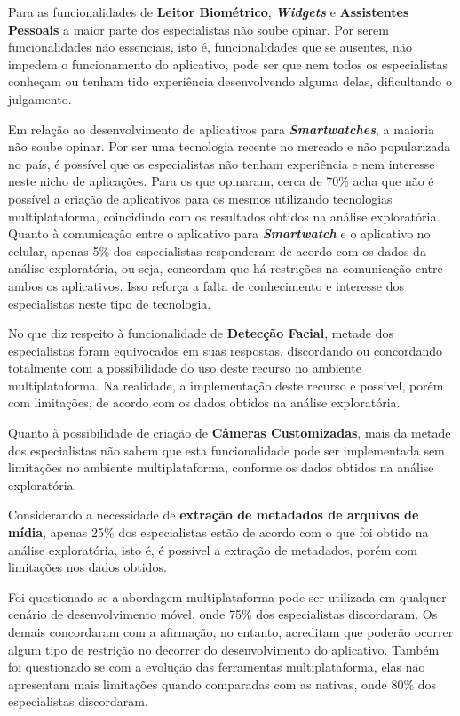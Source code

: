 Para as funcionalidades de \textbf{Leitor Biométrico}, \textbf{\textit{Widgets}} e \textbf{Assistentes Pessoais} a maior parte dos especialistas não soube opinar. Por serem funcionalidades não essenciais, isto é, 
funcionalidades que se ausentes, não impedem o funcionamento do aplicativo, pode ser que nem todos os especialistas conheçam ou tenham tido experiência desenvolvendo alguma delas, dificultando o julgamento. 

Em relação ao desenvolvimento de aplicativos para \textbf{\textit{Smartwatches}}, a maioria não soube opinar. Por ser uma tecnologia recente no mercado e não popularizada no país, é possível que os especialistas não 
tenham experiência e nem interesse neste nicho de aplicações. Para os que opinaram, cerca de 70\% acha que não é possível a criação de aplicativos para os mesmos utilizando tecnologias multiplataforma, coincidindo com 
os resultados obtidos na análise exploratória. Quanto à comunicação entre o aplicativo para \textbf{\textit{Smartwatch}} e o aplicativo no celular, apenas 5\% dos especialistas responderam de acordo com os dados da análise 
exploratória, ou seja, concordam que há restrições na comunicação entre ambos os aplicativos. Isso reforça a falta de conhecimento e interesse dos especialistas neste tipo de tecnologia.

No que diz respeito à funcionalidade de \textbf{Detecção Facial}, metade dos especialistas foram equivocados em suas respostas, discordando ou concordando totalmente com a possibilidade do uso deste recurso no ambiente 
multiplataforma. Na realidade, a implementação deste recurso e possível, porém com limitações, de acordo com os dados obtidos na análise exploratória.  

Quanto à possibilidade de criação de \textbf{Câmeras Customizadas}, mais da metade dos especialistas não sabem que esta funcionalidade pode ser implementada sem limitações no ambiente multiplataforma, conforme os dados 
obtidos na análise exploratória.

Considerando a necessidade de \textbf{extração de metadados de arquivos de mídia}, apenas 25\% dos especialistas estão de acordo com o que foi obtido na análise exploratória, isto é, é possível a extração de metadados, porém
com limitações nos dados obtidos.

Foi questionado se a abordagem multiplataforma pode ser utilizada em qualquer cenário de desenvolvimento móvel, onde 75\% dos especialistas discordaram. Os demais concordaram com a afirmação, no entanto, acreditam que 
poderão ocorrer algum tipo de restrição no decorrer do desenvolvimento do aplicativo. Também foi questionado se com a evolução das ferramentas multiplataforma, elas não apresentam mais limitações quando comparadas com as 
nativas, onde 80\% dos especialistas discordaram.

